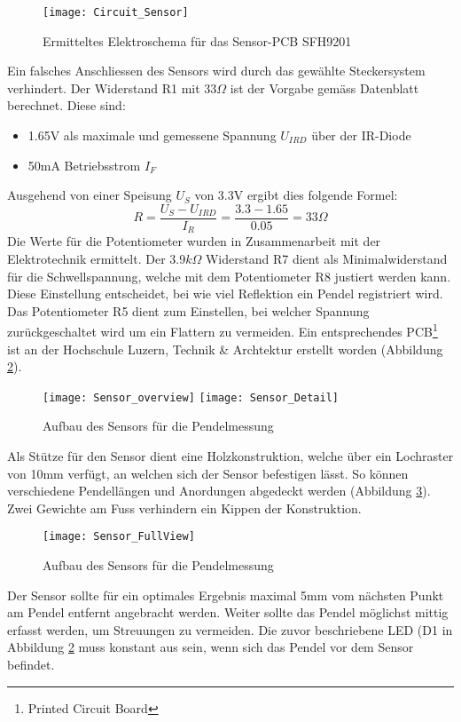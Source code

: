 	\begin{figure}[H]
		\centering
		\texttt{[image: Circuit\_Sensor]}
		\caption{Ermitteltes Elektroschema für das Sensor-PCB SFH9201}
		\label{fig:schema_sensor}
	\end{figure}
	\noindent Ein falsches Anschliessen des Sensors wird durch das gewählte Steckersystem verhindert. Der Widerstand R1 mit 33$\Omega$ ist der Vorgabe gemäss Datenblatt berechnet. Diese sind:
	\begin{itemize}
		\item 1.65V als maximale und gemessene Spannung $U_{IRD}$ über der IR-Diode
		\item 50mA Betriebsstrom $I_F$
	\end{itemize}
	Ausgehend von einer Speisung $U_S$ von 3.3V ergibt dies folgende Formel:
	\[
		R = \frac{U_S - U_{IRD}}{I_R} = \frac{3.3 - 1.65}{0.05} = 33\Omega
	\]
	Die Werte für die Potentiometer wurden in Zusammenarbeit mit der Elektrotechnik ermittelt. Der 3.9$k\Omega$ Widerstand R7 dient als Minimalwiderstand für die Schwellspannung, welche mit dem Potentiometer R8 justiert werden kann. Diese Einstellung entscheidet, bei wie viel Reflektion ein Pendel registriert wird.
Das Potentiometer R5 dient zum Einstellen, bei welcher Spannung zurückgeschaltet wird um ein Flattern zu vermeiden.
Ein entsprechendes PCB\footnote{Printed Circuit Board} ist an der Hochschule Luzern, Technik \& Archtektur erstellt worden (Abbildung \ref{fig:Sensor_overview}).\\
	\begin{figure}[H]
		\centering
		\texttt{[image: Sensor\_overview]}
		\texttt{[image: Sensor\_Detail]}
		\caption{Aufbau des Sensors für die Pendelmessung}
		\label{fig:Sensor_overview}
	\end{figure}
	\noindent Als Stütze für den Sensor dient eine Holzkonstruktion, welche über ein Lochraster von 10mm verfügt, an welchen sich der Sensor befestigen lässt. So können verschiedene Pendellängen und Anordungen abgedeckt werden (Abbildung \ref{fig:Sensor_FullView}). Zwei Gewichte am Fuss verhindern ein Kippen der Konstruktion.
	\begin{figure}[H]
		\centering
		\texttt{[image: Sensor\_FullView]}
		\caption{Aufbau des Sensors für die Pendelmessung}
		\label{fig:Sensor_FullView}
	\end{figure}
	\noindent Der Sensor sollte für ein optimales Ergebnis maximal 5mm vom nächsten Punkt am Pendel entfernt angebracht werden. Weiter sollte das Pendel möglichst mittig erfasst werden, um Streuungen zu vermeiden. Die zuvor beschriebene LED (D1 in Abbildung \ref{fig:Sensor_overview} muss konstant aus sein, wenn sich das Pendel vor dem Sensor befindet. 
